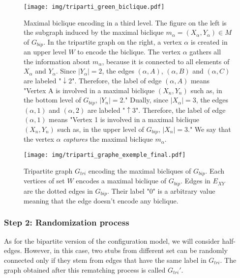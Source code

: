 \documentclass[table]{report}
\begin{document}

\begin{figure}[h]%
\centering
\texttt{[image: img/triparti\_green\_biclique.pdf]}
\caption{Maximal biclique encoding in a third level. The figure on the left is the subgraph induced by the maximal biclique $m_\alpha = (X_\alpha, Y_\alpha) \in M$  of $G_{bip}$. In the tripartite graph on the right, a vertex $\alpha$ is created in an upper level $W$ to encode the biclique. The vertex $\alpha$ gathers all the information about $m_\alpha$, because it is connected to all elements of $X_\alpha$ and $Y_\alpha$. Since $|Y_\alpha| =  2$, the edges $(\alpha,A)$, $(\alpha,B)$ and $(\alpha,C)$ are labeled "$\downarrow 2$". Therefore, the label of edge $(\alpha,A)$ means "Vertex A is involved in a maximal biclique $(X_n, Y_n)$ such as, in the bottom level of $G_{bip}$, $|Y_n| = 2$." Dually, since $|X_\alpha| =  3$, the edges $(\alpha,1)$ and $(\alpha,2)$ are labeled "$\uparrow 3$". Therefore, the label of edge $(\alpha,1)$ means "Vertex 1 is involved in a maximal biclique $(X_n, Y_n)$ such as, in the upper level of $G_{bip}$, $|X_n| = 3$." We say that the vertex $\alpha$ \textit{captures} the maximal biclique $m_\alpha$.}
\label{fig:directed_weighted_examples}
\end{figure}
\FloatBarrier


\begin{figure}[h]%
\centering
\texttt{[image: img/triparti\_graphe\_exemple\_final.pdf]}
\caption{Tripartite graph ${G_{tri}}$ encoding the maximal bicliques of $G_{bip}$. Each vertices of set $W$ encodes a maximal biclique of $G_{bip}$. Edges in $E_{XY}$ are the dotted edges in $G_{bip}$. Their label "0" is a arbitrary value meaning that the edge doesn't encode any biclique.}
\label{fig:triparti_graphe_exemple_final}
\end{figure}
\FloatBarrier

\subsubsection{Step 2: Randomization process}

As for the bipartite version of the configuration model, we will consider half-edges. However, in this case, two stubs from different set can be randomly connected only if they stem from edges that have the same label in ${G_{tri}}$. The graph obtained after this rematching process is called ${G_{tri}}'$.
\end{document}
